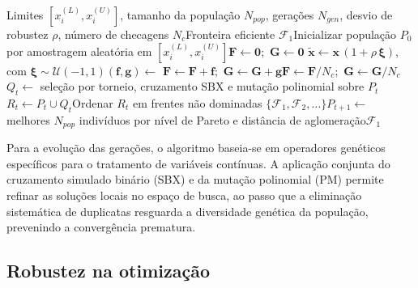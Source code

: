  \begin{algorithm}[!ht]
 \caption{Otimização robusta multiobjetivo via NSGA-II}
 \label{alg:nsga2}
 \begin{algorithmic}[1]
 \Require Limites $[x_i^{(L)}, x_i^{(U)}]$, tamanho da população $N_{pop}$, gerações $N_{gen}$, desvio de robustez $\rho$, número de checagens $N_c$\Ensure Fronteira eficiente $\mathcal{F}_1$\State Inicializar população $P_0$ por amostragem aleatória em $[x_i^{(L)}, x_i^{(U)}]$\State $\mathbf{F} \gets \mathbf{0}$;\ $\mathbf{G} \gets \mathbf{0}$ \State $\tilde{\mathbf{x}} \gets \mathbf{x}\,(1 + \rho\,\boldsymbol{\xi})$, com $\boldsymbol{\xi} \sim \mathcal{U}(-1,1)$\State $(\mathbf{f}, \mathbf{g}) \gets$ \State $\mathbf{F} \gets \mathbf{F} + \mathbf{f}$;\ $\mathbf{G} \gets \mathbf{G} + \mathbf{g}$\EndFor\State $\mathbf{F} \gets \mathbf{F}/N_c$;\ $\mathbf{G} \gets \mathbf{G}/N_c$ \EndFor\State $Q_t \gets$ seleção por torneio, cruzamento SBX e mutação polinomial sobre $P_t$\State $R_t \gets P_t \cup Q_t$\State Ordenar $R_t$ em frentes não dominadas $\{\mathcal{F}_1, \mathcal{F}_2, \ldots\}$\State $P_{t+1} \gets$ melhores $N_{pop}$ indivíduos por nível de Pareto e distância de aglomeração\EndFor\State \Return $\mathcal{F}_1$
 \end{algorithmic}
 \end{algorithm}
 
Para a evolução das gerações, o algoritmo baseia-se em operadores genéticos específicos para o tratamento de variáveis contínuas. A aplicação conjunta do cruzamento simulado binário (SBX) e da mutação polinomial (PM) permite refinar as soluções locais no espaço de busca, ao passo que a eliminação sistemática de duplicatas resguarda a diversidade genética da população, prevenindo a convergência prematura.
 
 \subsection{Robustez na otimização}\label{sec:robustez}
 
